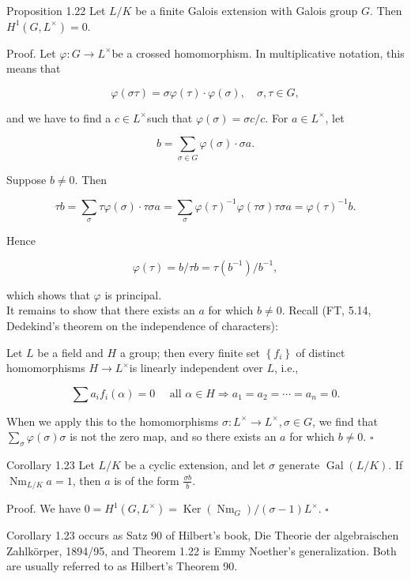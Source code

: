 \documentclass[10pt]{article}
\begin{document}
Proposition 1.22 Let $L / K$ be a finite Galois extension with Galois group $G$. Then $H^{1}\left(G, L^{\times}\right)=0$.

Proof. Let $\varphi: G \rightarrow L^{\times}$be a crossed homomorphism. In multiplicative notation, this means that

$$
\varphi(\sigma \tau)=\sigma \varphi(\tau) \cdot \varphi(\sigma), \quad \sigma, \tau \in G,
$$

and we have to find a $c \in L^{\times}$such that $\varphi(\sigma)=\sigma c / c$. For $a \in L^{\times}$, let

$$
b=\sum_{\sigma \in G} \varphi(\sigma) \cdot \sigma a .
$$

Suppose $b \neq 0$. Then

$$
\tau b=\sum_{\sigma} \tau \varphi(\sigma) \cdot \tau \sigma a=\sum_{\sigma} \varphi(\tau)^{-1} \varphi(\tau \sigma) \tau \sigma a=\varphi(\tau)^{-1} b .
$$

Hence

$$
\varphi(\tau)=b / \tau b=\tau\left(b^{-1}\right) / b^{-1},
$$

which shows that $\varphi$ is principal.\\
It remains to show that there exists an $a$ for which $b \neq 0$. Recall (FT, 5.14, Dedekind's theorem on the independence of characters):

Let $L$ be a field and $H$ a group; then every finite set $\left\{f_{i}\right\}$ of distinct homomorphisms $H \rightarrow L^{\times}$is linearly independent over $L$, i.e.,

$$
\sum a_{i} f_{i}(\alpha)=0 \quad \text { all } \alpha \in H \Rightarrow a_{1}=a_{2}=\cdots=a_{n}=0 .
$$

When we apply this to the homomorphisms $\sigma: L^{\times} \rightarrow L^{\times}, \sigma \in G$, we find that $\sum_{\sigma} \varphi(\sigma) \sigma$ is not the zero map, and so there exists an $a$ for which $b \neq 0$. \(\square\)

Corollary 1.23 Let $L / K$ be a cyclic extension, and let $\sigma$ generate $\operatorname{Gal}(L / K)$. If $\operatorname{Nm}_{L / K} a=1$, then $a$ is of the form $\frac{\sigma b}{b}$.

Proof. We have $0=H^{1}\left(G, L^{\times}\right)=\operatorname{Ker}\left(\operatorname{Nm}_{G}\right) /(\sigma-1) L^{\times}$. \(\square\)

Corollary 1.23 occurs as Satz 90 of Hilbert's book, Die Theorie der algebraischen Zahlkörper, 1894/95, and Theorem 1.22 is Emmy Noether's generalization. Both are usually referred to as Hilbert's Theorem 90.
\end{document}
